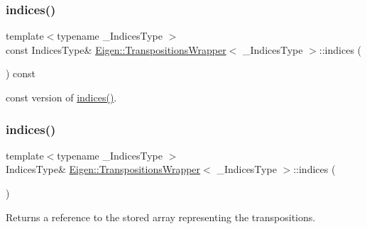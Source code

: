 \subsubsection{\texorpdfstring{indices()}{indices()}\hspace{0.1cm}{\footnotesize\ttfamily [1/2]}}
{\footnotesize\ttfamily template$<$typename \+\_\+\+Indices\+Type $>$ \\
const Indices\+Type\& \mbox{\hyperlink{class_eigen_1_1_transpositions_wrapper}{Eigen\+::\+Transpositions\+Wrapper}}$<$ \+\_\+\+Indices\+Type $>$\+::indices (\begin{DoxyParamCaption}{ }\end{DoxyParamCaption}) const\hspace{0.3cm}{\ttfamily [inline]}}

const version of \mbox{\hyperlink{class_eigen_1_1_transpositions_wrapper_aab0aee4242436a7223fea797a1fa8ee9}{indices()}}. \mbox{\label{class_eigen_1_1_transpositions_wrapper_aab0aee4242436a7223fea797a1fa8ee9}} 
\subsubsection{\texorpdfstring{indices()}{indices()}\hspace{0.1cm}{\footnotesize\ttfamily [2/2]}}
{\footnotesize\ttfamily template$<$typename \+\_\+\+Indices\+Type $>$ \\
Indices\+Type\& \mbox{\hyperlink{class_eigen_1_1_transpositions_wrapper}{Eigen\+::\+Transpositions\+Wrapper}}$<$ \+\_\+\+Indices\+Type $>$\+::indices (\begin{DoxyParamCaption}{ }\end{DoxyParamCaption})\hspace{0.3cm}{\ttfamily [inline]}}

\begin{DoxyReturn}{Returns}
a reference to the stored array representing the transpositions. 
\end{DoxyReturn}
\mbox{\label{class_eigen_1_1_transpositions_wrapper_ac4e1956279759cbda2c9f2784197cfe9}} 
